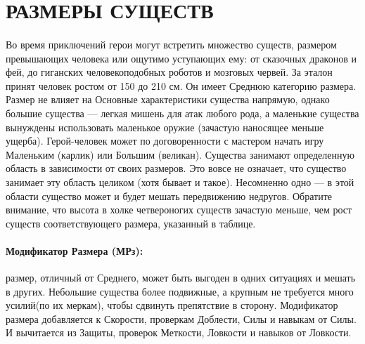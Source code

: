 \section{РАЗМЕРЫ СУЩЕСТВ}
\paragraph{}
Во время приключений герои могут встретить множество существ, размером превышающих человека или ощутимо уступающих ему: от сказочных драконов и фей, до гиганских человекоподобных роботов и мозговых червей. За эталон принят человек ростом от 150 до 210 см. Он имеет Среднюю категорию размера. Размер не влияет на Основные характеристики существа напрямую, однако большие существа — легкая мишень для атак любого рода, а маленькие существа вынуждены использовать маленькое оружие (зачастую наносящее меньше ущерба). Герой-человек может по договоренности с мастером начать игру Маленьким (карлик) или Большим (великан).
\newline
Существа занимают определенную область в зависимости от своих размеров. Это вовсе не означает, что существо занимает эту область целиком (хотя бывает и такое). Несомненно одно — в этой области существо может и будет мешать передвижению недругов. Обратите внимание, что высота в холке четвероногих существ зачастую меньше, чем рост существ соответствующего размера, указанный в таблице.
\paragraph{Модификатор Размера (МРз):} размер, отличный от Среднего, может быть выгоден в одних ситуациях и мешать в других. Небольшие существа более подвижные, а крупным не требуется много усилий(по их меркам), чтобы сдвинуть препятствие в сторону.
\newline
Модификатор размера добавляется к Скорости, проверкам Доблести, Силы и навыкам от Силы. И вычитается из Защиты, проверок Меткости, Ловкости и навыков от Ловкости.
